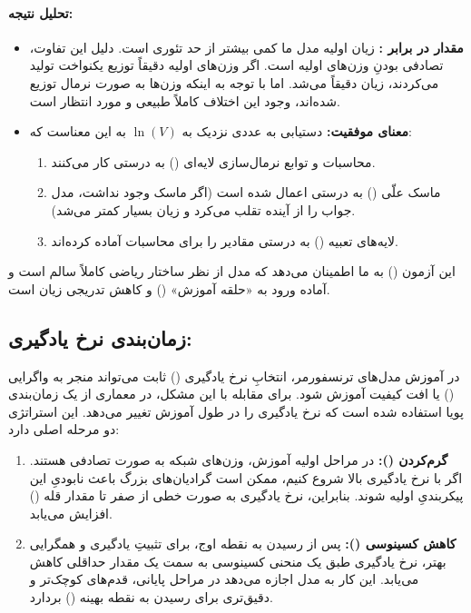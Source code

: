 \documentclass{article}
\begin{document}
\paragraph{تحلیل نتیجه:}
\begin{itemize}
	\item \textbf{مقدار  در برابر :} زیان اولیه مدل ما کمی بیشتر از حد تئوری است. دلیل این تفاوت، تصادفی بودنِ وزن‌های اولیه است. اگر وزن‌های اولیه دقیقاً توزیع یکنواخت تولید می‌کردند، زیان دقیقاً  می‌شد. اما با توجه به اینکه وزن‌ها به صورت نرمال توزیع شده‌اند، وجود این اختلاف کاملاً طبیعی و مورد انتظار است.
	\item \textbf{معنای موفقیت:} دستیابی به عددی نزدیک به $\ln(V)$ به این معناست که:
	\begin{enumerate}
		\item محاسبات  و توابع نرمال‌سازی لایه‌ای () به درستی کار می‌کنند.
		\item ماسک علّی () به درستی اعمال شده است (اگر ماسک وجود نداشت، مدل جواب را از آینده تقلب می‌کرد و زیان بسیار کمتر می‌شد).
		\item لایه‌های تعبیه () به درستی مقادیر را برای محاسبات آماده کرده‌اند.
	\end{enumerate}
\end{itemize}

این آزمون () به ما اطمینان می‌دهد که مدل از نظر ساختار ریاضی کاملاً سالم است و آماده ورود به «حلقه آموزش» () و کاهش تدریجی زیان است.

\subsection{زمان‌بندی نرخ یادگیری: }

در آموزش مدل‌های ترنسفورمر، انتخابِ نرخ یادگیری () ثابت می‌تواند منجر به واگرایی () یا افت کیفیت آموزش شود. برای مقابله با این مشکل، در معماری  از یک زمان‌بندی پویا استفاده شده است که نرخ یادگیری را در طول آموزش تغییر می‌دهد. این استراتژی دو مرحله اصلی دارد:

\begin{enumerate}
	\item \textbf{گرم‌کردن ():} در مراحل اولیه آموزش، وزن‌های شبکه به صورت تصادفی هستند. اگر با نرخ یادگیری بالا شروع کنیم، ممکن است گرادیان‌های بزرگ باعث نابودیِ این پیکربندیِ اولیه شوند. بنابراین، نرخ یادگیری به صورت خطی از صفر تا مقدار قله () افزایش می‌یابد.
	\item \textbf{کاهش کسینوسی ():} پس از رسیدن به نقطه اوج، برای تثبیتِ یادگیری و همگرایی بهتر، نرخ یادگیری طبق یک منحنی کسینوسی به سمت یک مقدار حداقلی کاهش می‌یابد. این کار به مدل اجازه می‌دهد در مراحل پایانی، قدم‌های کوچک‌تر و دقیق‌تری برای رسیدن به نقطه بهینه () بردارد.
\end{enumerate}
\end{document}
